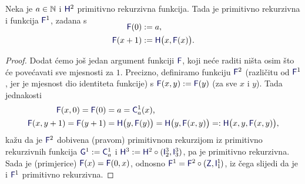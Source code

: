 \begin{propozicija}[{name=[jednomjesna funkcija primitivnom rekurzijom]}]\label{prop:F1prn}
Neka je $a\in{\mathbb N}$ i $\f H^2$ primitivno rekurzivna funkcija.
    Tada je primitivno rekurzivna i funkcija $\f F^1$, zadana s
\begin{align}
\SwapAboveDisplaySkip
    \f F(0)&:=a\text,\\
    \f F(x+1)&:=\f H\bigl(x,\f F(x)\bigr)\text.
\end{align}
\end{propozicija}
\begin{proof}
	Dodat ćemo još jedan argument funkciji $\f F$, koji neće raditi ništa osim što će povećavati sve mjesnosti za $1$. Precizno, definiramo funkciju $\f F^2$ (različitu od $\f F^1$\!, jer je mjesnost dio identiteta funkcije) s $\f F(x,y):=\f F(y)$ (za sve $x$ i $y$). Tada jednakosti
\begin{align}
	\f F(x,0)=\f F(0)&=a=\f C_a^1(x)\text,\\
	\f F(x,y+1)=\f F(y+1)&=\f H\bigl(y,\f F(y)\bigr)=\f H\bigl(y,\f F(x,y)\bigr)=:\f H\bigl(x,y,\f F(x,y)\bigr)\text,
\end{align}
	kažu da je $\f F^2$ dobivena (pravom) primitivnom rekurzijom iz primitivno rekurzivnih funkcija $\f G^1:=\f C_a^1$ i $\f H^3:=\f H^2\circ(\f I_2^3,\f I_3^3)$, pa je primitivno rekurzivna. %
%
	Sada je (primjerice) $\f F(x)=\f F(0,x)$, odnosno $\f F^1=\f F^2\circ(\f Z,\f I_1^1\mspace{-1mu})$, iz čega slijedi da je i $\f F^1$ primitivno rekurzivna.
\end{proof}

